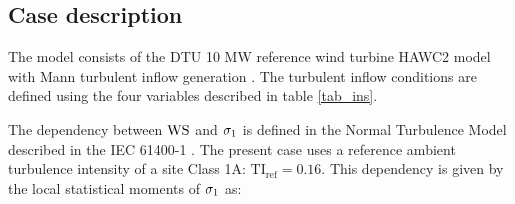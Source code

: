 \documentclass[preprint,12pt]{elsarticle}
\begin{document}
\subsection{Case description}

The model consists of the DTU 10 MW reference wind turbine HAWC2 model \cite{larsen20072, bak2012light} with Mann turbulent inflow generation \cite{Mann1998}. The turbulent inflow conditions are defined using the four variables described in table \ref{tab_ins}.

\begin{table}[!h]
\begin{centering}
\caption{Wind turbine model inputs.}
\label{tab_ins}
\end{centering}
\end{table}

The dependency between $\text{WS}$ and $\sigma_{1}$ is defined in the Normal Turbulence Model described in the IEC 61400-1 \cite{international2005iec}. The present case uses a reference ambient turbulence intensity of a site Class 1A:  $\text{TI}_{\text{ref}} = 0.16$. This dependency is given by the local statistical moments of $\sigma_{1}$ as:

\end{document}
